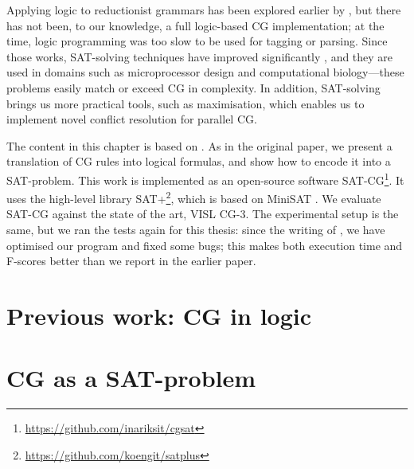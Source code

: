 
Applying logic to reductionist grammars has been explored earlier by \cite{lager98,lager_nivre01}, but there has not been, to our knowledge, a full logic-based CG implementation; at the time, logic programming was too slow to be used for tagging or parsing. 
Since those works, SAT-solving techniques have improved significantly \cite{marques_silva2010}, and they are used in domains such as microprocessor design and computational 
biology---these problems easily match or exceed CG in complexity. 
In addition, SAT-solving brings us more practical tools, such as maximisation, which enables us to implement novel conflict resolution for parallel CG.


The content in this chapter is based on \cite{listenmaa_claessen2015}.
As in the original paper, we present a translation of CG rules into logical formulas, and show how to encode it into a SAT-problem.
This work is implemented as an open-source software SAT-CG\footnote{\url{https://github.com/inariksit/cgsat}}. It uses the high-level library SAT+\footnote{\url{https://github.com/koengit/satplus}}, which is based on MiniSAT \cite{een04sat}.
We evaluate SAT-CG against the state of the art, VISL CG-3.
The experimental setup is the same, but we ran the tests again for this thesis: since the writing of  \cite{listenmaa_claessen2015}, we have optimised our program and fixed some bugs; this 
makes both execution time and F-scores better than we report in the earlier paper. 


\section{Previous work: CG in logic}\label{encoding-in-logic}




\section{CG as a SAT-problem}
\label{sec:CGSAT}

